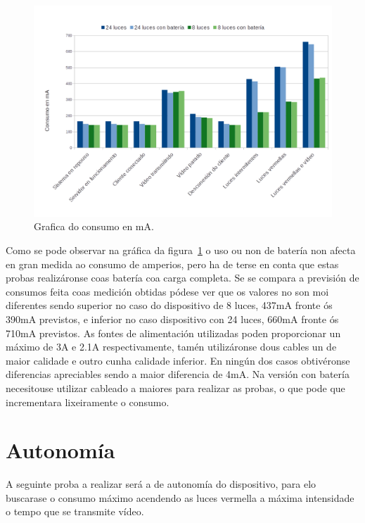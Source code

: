 \begin{figure}[tbp]
  \centering
  \includegraphics[scale=.5]{imaxes/grafica-amperaxe.png}
  \caption{Grafica do consumo en mA.}
  \label{fig:amperaxe}
\end{figure}
Como se pode observar na gráfica da figura~\ref{fig:amperaxe} o uso ou non de batería non afecta en gran medida ao consumo de amperios, pero ha de terse en conta que estas probas realizáronse coas batería coa carga completa. Se se compara a previsión de consumos feita coas medición obtidas
pódese ver que os valores no son moi diferentes sendo superior no caso do dispositivo de 8 luces, 437mA fronte ós 390mA previstos, e inferior no caso dispositivo con 24 luces, 660mA fronte ós 710mA previstos.
As fontes de alimentación utilizadas poden proporcionar un máximo de 3A e 2.1A respectivamente, tamén utilizáronse dous cables un de maior calidade e outro cunha calidade inferior. En ningún dos casos obtivéronse diferencias apreciables sendo a maior diferencia de 4mA. Na versión con batería necesitouse utilizar cableado a maiores para realizar as probas, o que pode que incrementara lixeiramente o consumo.

\section{Autonomía}

A seguinte proba a realizar será a de autonomía do dispositivo, para elo buscarase o consumo máximo acendendo as luces vermella a máxima intensidade o tempo que se transmite vídeo.


